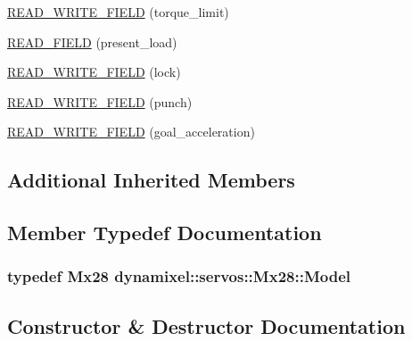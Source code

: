 \begin{DoxyCompactItemize}
\item 
\hyperlink{classdynamixel_1_1servos_1_1_mx28_ae241e576372946e01a7668ddd8d795ce}{R\+E\+A\+D\+\_\+\+W\+R\+I\+T\+E\+\_\+\+F\+I\+E\+LD} (torque\+\_\+limit)
\item 
\hyperlink{classdynamixel_1_1servos_1_1_mx28_aa985d4cc67267bcdb60c00268a3dd3f0}{R\+E\+A\+D\+\_\+\+F\+I\+E\+LD} (present\+\_\+load)
\item 
\hyperlink{classdynamixel_1_1servos_1_1_mx28_a4c4a358db564bbf4fa75b9303c884f8d}{R\+E\+A\+D\+\_\+\+W\+R\+I\+T\+E\+\_\+\+F\+I\+E\+LD} (lock)
\item 
\hyperlink{classdynamixel_1_1servos_1_1_mx28_a6ab5262e0ff983c2d670dfc35227fbb5}{R\+E\+A\+D\+\_\+\+W\+R\+I\+T\+E\+\_\+\+F\+I\+E\+LD} (punch)
\item 
\hyperlink{classdynamixel_1_1servos_1_1_mx28_ade90f07c11e12170a2c0fdae200c82cb}{R\+E\+A\+D\+\_\+\+W\+R\+I\+T\+E\+\_\+\+F\+I\+E\+LD} (goal\+\_\+acceleration)
\end{DoxyCompactItemize}
\subsection*{Additional Inherited Members}


\subsection{Member Typedef Documentation}
\subsubsection[{\texorpdfstring{Model}{Model}}]{\setlength{\rightskip}{0pt plus 5cm}typedef {\bf Mx28} {\bf dynamixel\+::servos\+::\+Mx28\+::\+Model}}\hypertarget{classdynamixel_1_1servos_1_1_mx28_a417eef0237fabc40e4dde49697c654a6}{}\label{classdynamixel_1_1servos_1_1_mx28_a417eef0237fabc40e4dde49697c654a6}


\subsection{Constructor \& Destructor Documentation}
